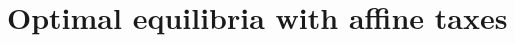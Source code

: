 \documentclass[11.5pt,twoside]{article}
\newtheorem{corollary}{Corollary}
\begin{document}
%
%
%
%
%


\section{Optimal equilibria with affine taxes}\label{Sec: Bellman equations}
\end{document}
